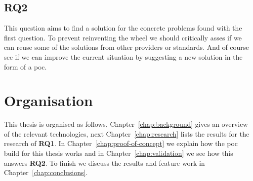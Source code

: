 \subsection{RQ2}
\label{subsec:rq2}
This question aims to find a solution for the concrete problems found with the first question. To prevent reinventing the wheel we should critically asses if we can reuse some of the solutions from other providers or standards. And of course see if we can improve the current situation by suggesting a new solution in the form of a \gls{poc}.

\section{Organisation}
\label{sec:organisation}
This thesis is organised as follows, Chapter~\ref{chap:background} gives an overview of the relevant technologies, next Chapter~\ref{chap:research} lists the results for the research of \textbf{RQ1}. In Chapter~\ref{chap:proof-of-concept} we explain how the \gls{poc} build for this thesis works and in Chapter~\ref{chap:validation} we see how this answers \textbf{RQ2}. To finish we discuss the results and feature work in Chapter~\ref{chap:conclusions}.
